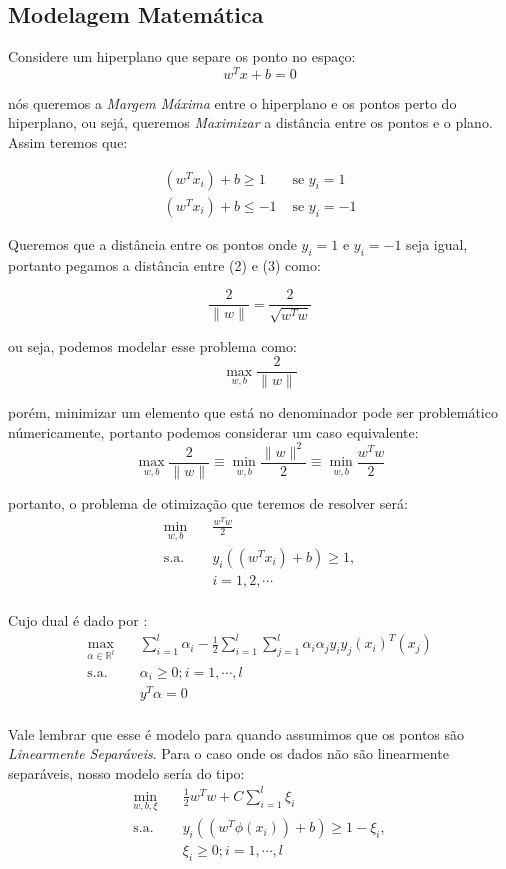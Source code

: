 \documentclass{article}
\begin{document}
\subsection{Modelagem Matemática}

 Considere um hiperplano que separe os ponto no espaço:
\[w^Tx+b=0\]

nós queremos a \textit{Margem Máxima} entre o hiperplano e os pontos perto do hiperplano, ou sejá, queremos \textit{Maximizar} a distância entre os pontos e o plano. Assim teremos que:

\begin{align}
    (w^Tx_i)+b\geq 1 &\text{ se } y_i=1 \\
    (w^Tx_i)+b\leq -1 &\text{ se } y_i=-1
\end{align}

Queremos que a distância entre os pontos onde \(y_i=1\) e \(y_i=-1\) seja igual, portanto pegamos a distância entre (2) e (3) como:

\[\frac{2}{\|w\|}= \frac{2}{\sqrt{w^Tw}}\]

ou seja, podemos modelar esse problema como:
\[\max_{w,b}\frac{2}{\|w\|}\]

porém, minimizar um elemento que está no denominador pode ser problemático númericamente, portanto podemos considerar um caso equivalente:
\[\max_{w,b}\frac{2}{\|w\|}\equiv \min_{w,b}\frac{\|w\|^2}{2}\equiv\min_{w,b}\frac{w^Tw}{2}\]

portanto, o problema de otimização que teremos de resolver será:
\[
\begin{aligned}
\min_{w,b} \quad & \frac{w^Tw}{2}\\
\textrm{s.a.} \quad & y_i((w^Tx_i)+b)\geq1,\\
  &i=1,2,\cdots    \\
\end{aligned}
\]

Cujo dual é dado por \cite{Evelin}:
\[
\begin{aligned}
\max_{\alpha\in \mathbb{R}^l} \quad &\sum_{i=1}^{l}\alpha_i-\frac{1}{2}\sum_{i=1}^{l}\sum_{j=1}^{l}\alpha_i\alpha_j y_i y_j(x_i)^T(x_j)\\
\textrm{s.a.} \quad & \alpha_i\geq0;i=1,\cdots,l\\
  &y^T\alpha=0   \\
\end{aligned}\]

Vale lembrar que esse é modelo para quando assumimos que os pontos são \textit{Linearmente Separáveis}. Para o caso onde os dados não são linearmente separáveis, nosso modelo sería do tipo:
\[
\begin{aligned}
\min_{w,b,\xi} \quad &\frac{1}{2}w^Tw+C\sum_{i=1}^{l}\xi_i\\
\textrm{s.a.} \quad & y_i((w^T\phi(x_i))+b)\geq1-\xi_i,\\
  &\xi_i\geq0;i=1,\cdots,l   \\
\end{aligned}
\]
\end{document}
